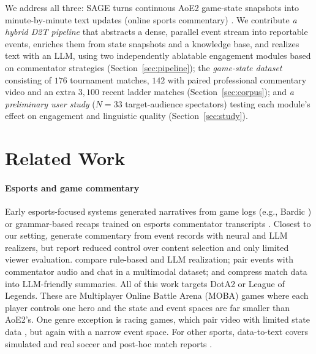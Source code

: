 \documentclass[11pt]{article}
\begin{document}
We address all three: SAGE turns continuous AoE2 game-state snapshots into minute-by-minute text updates (online sports commentary) \citep{pavzanin2022,lewandowski2012}. We contribute \textit{a hybrid D2T pipeline} that abstracts a dense, parallel event stream into reportable events, enriches them from state snapshots and a knowledge base, and realizes text with an LLM, using two independently ablatable engagement modules based on commentator strategies (Section~\ref{sec:pipeline}); the \textit{game-state dataset} consisting of $176$ tournament matches, $142$ with paired professional commentary video and an extra $3{,}100$ recent ladder matches (Section~\ref{sec:corpus}); and \textit{a preliminary user study} ($N=33$ target-audience spectators) testing each module's effect on engagement and linguistic quality (Section~\ref{sec:study}).

\section{Related Work}
\paragraph{Esports and game commentary}
Early esports-focused systems generated narratives from game logs (e.g., Bardic \citep{barot2017}) or grammar-based recaps trained on esports commentator transcripts \citep{elarewaju2020}. Closest to our setting, \citet{wang2021, wang2024, wang2025} generate commentary from event records with neural and LLM realizers, but report reduced control over content selection and only limited viewer evaluation. \citet{zhang2022} compare rule-based and LLM realization; \citet{zhang2024} pair events with commentator audio and chat in a multimodal dataset; and \citet{kim2025} compress match data into LLM-friendly summaries. All of this work targets DotA2 or League of Legends. These are Multiplayer Online Battle Arena (MOBA) games where each player controls one hero and the state and event spaces are far smaller than AoE2's. One genre exception is racing games, which pair video with limited state data \citep{ishigaki2021}, but again with a narrow event space. For other sports, data-to-text covers simulated \citep{voelz1998} and real \citep{taniguchi2019} soccer and post-hoc match reports \citep{vanderlee2017}.
\end{document}
